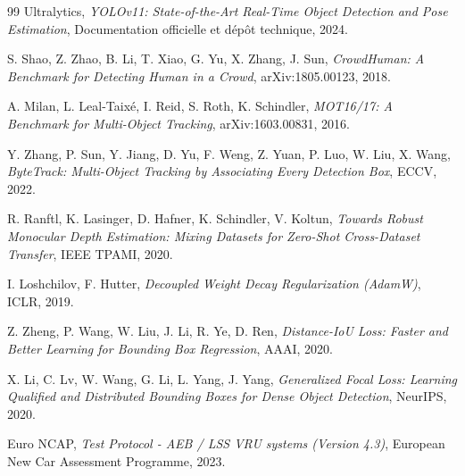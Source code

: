 \documentclass[11pt,a4paper]{article}
\begin{document}
\newpage
\begin{thebibliography}{99}
Ultralytics, \emph{YOLOv11: State-of-the-Art Real-Time Object Detection and Pose Estimation}, Documentation officielle et dépôt technique, 2024.

S. Shao, Z. Zhao, B. Li, T. Xiao, G. Yu, X. Zhang, J. Sun, \emph{CrowdHuman: A Benchmark for Detecting Human in a Crowd}, arXiv:1805.00123, 2018.

A. Milan, L. Leal-Taixé, I. Reid, S. Roth, K. Schindler, \emph{MOT16/17: A Benchmark for Multi-Object Tracking}, arXiv:1603.00831, 2016.

Y. Zhang, P. Sun, Y. Jiang, D. Yu, F. Weng, Z. Yuan, P. Luo, W. Liu, X. Wang, \emph{ByteTrack: Multi-Object Tracking by Associating Every Detection Box}, ECCV, 2022.

R. Ranftl, K. Lasinger, D. Hafner, K. Schindler, V. Koltun, \emph{Towards Robust Monocular Depth Estimation: Mixing Datasets for Zero-Shot Cross-Dataset Transfer}, IEEE TPAMI, 2020.

I. Loshchilov, F. Hutter, \emph{Decoupled Weight Decay Regularization (AdamW)}, ICLR, 2019.

Z. Zheng, P. Wang, W. Liu, J. Li, R. Ye, D. Ren, \emph{Distance-IoU Loss: Faster and Better Learning for Bounding Box Regression}, AAAI, 2020.

X. Li, C. Lv, W. Wang, G. Li, L. Yang, J. Yang, \emph{Generalized Focal Loss: Learning Qualified and Distributed Bounding Boxes for Dense Object Detection}, NeurIPS, 2020.

Euro NCAP, \emph{Test Protocol - AEB / LSS VRU systems (Version 4.3)}, European New Car Assessment Programme, 2023.
\end{thebibliography}
\end{document}
